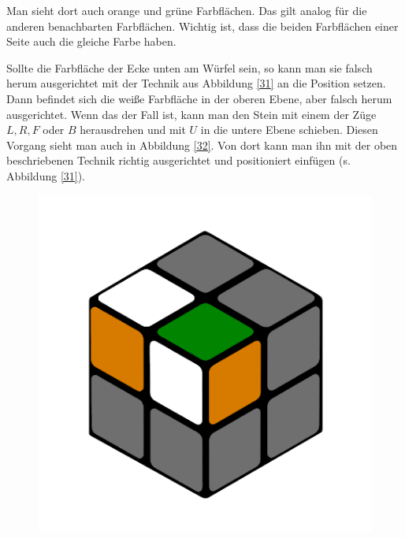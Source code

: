 \documentclass[12pt,a4paper, usenames, dvipsnames]{article}
\begin{document}
Man sieht dort auch orange und grüne Farbflächen. Das gilt analog für die anderen benachbarten Farbflächen. Wichtig ist, dass die beiden Farbflächen einer Seite auch die gleiche Farbe haben.

Sollte die Farbfläche der Ecke unten am Würfel sein, so kann man sie falsch herum ausgerichtet mit der Technik aus Abbildung \ref{31} an die Position setzen. Dann befindet sich die weiße Farbfläche in der oberen Ebene, aber falsch herum ausgerichtet. Wenn das der Fall ist, kann man den Stein mit einem der Züge $L, R, F$ oder $B$ herausdrehen und mit $U$ in die untere Ebene schieben. Diesen Vorgang sieht man auch in Abbildung \ref{32}. Von dort kann man ihn mit der oben beschriebenen Technik richtig ausgerichtet und positioniert einfügen (s. Abbildung \ref{31}). 

\begin{figure}[h]
\centering
\includegraphics[scale=0.1]{e1_s2_s1_s.png}

\end{figure}
\end{document}
